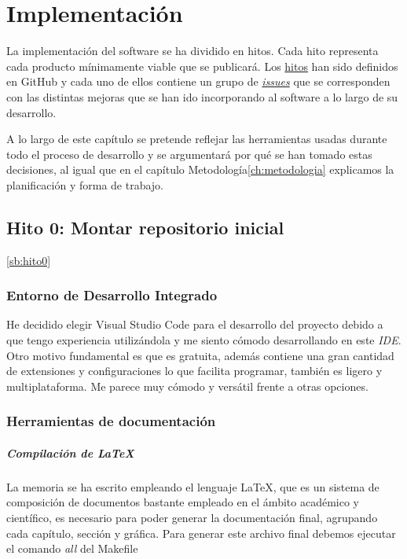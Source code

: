 \chapter{Implementación}

La implementación del software se ha dividido en hitos. Cada hito representa cada producto mínimamente viable que se publicará.
Los \href{https://github.com/RubenDelgadoPareja/TFG-Triage-Inteligente-Consulta-Medica/milestones}{hitos} han sido definidos en GitHub y
cada uno de ellos contiene un grupo de \href{https://github.com/RubenDelgadoPareja/TFG-Triage-Inteligente-Consulta-Medica/issues}{\textit{issues}} que se corresponden
con las distintas mejoras que se han ido incorporando al software a lo largo de su desarrollo.

A lo largo de este capítulo se pretende reflejar las herramientas usadas durante todo el proceso de desarrollo y
se argumentará por qué se han tomado estas decisiones, al igual que en el capítulo Metodología{\ref{ch:metodologia}} explicamos
la planificación y forma de trabajo.

\section{Hito 0: Montar repositorio inicial}\ref{sb:hito0}

\subsection{Entorno de Desarrollo Integrado}
He decidido elegir Visual Studio Code para el desarrollo del proyecto debido a que tengo experiencia utilizándola y me siento cómodo desarrollando en este {\textit{IDE}}.
Otro motivo fundamental es que es gratuita, además contiene una gran cantidad de extensiones y configuraciones lo que facilita programar, también es ligero y multiplataforma.
Me parece muy cómodo y versátil frente a otras opciones.

\subsection{Herramientas de documentación}

\paragraph*{Compilación de LaTeX}
La memoria se ha escrito empleando el lenguaje LaTeX, que es un sistema de composición de documentos bastante empleado
en el ámbito académico y científico, es necesario para poder generar la documentación final, agrupando cada capítulo, sección y
gráfica. Para generar este archivo final debemos ejecutar el comando \textit{all} del Makefile


